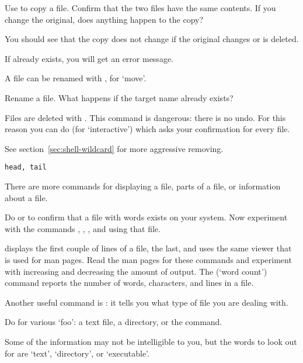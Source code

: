 \begin{exercise}
  Use  to copy a file. Confirm that the two files
  have the same contents. If you change the original, does anything
  happen to the copy?
\end{exercise}
\begin{outcome}
  You should see that the copy does not change if the original changes
  or is deleted.
\end{outcome}
\begin{caution}
  If  already exists, you
  will get an error message.
\end{caution}

A file can be renamed with , for `move'.

\begin{exercise}
  Rename a file. What happens if the target name already exists?
\end{exercise}


Files are deleted with . This command is dangerous: there is no
undo.
For this reason you can do  (for `interactive') which
asks your confirmation for every file.

See section~\ref{sec:shell-wildcard} for more aggressive removing.

 {\texttt{head, tail}}

There are more commands for displaying a file, parts of a file, or
information about a file. 

\begin{exercise}
  Do  or  to
  confirm that a file with words exists on your system. Now experiment
  with the commands , , , and  using
  that file.
\end{exercise}
\begin{outcome}
   displays the first couple of lines of a file,
   the last, and  uses the
  same viewer that is used for man pages. Read the man pages for these
  commands and experiment with increasing and decreasing the amount of
  output.  The  (`word count') command reports the
  number of words, characters, and lines in a file.
\end{outcome}

Another useful command is : it tells you what
type of file you are dealing with.

\begin{exercise}
  Do  for various `foo': a text file, a directory, or the
   command.
\end{exercise}
\begin{outcome}
  Some of the information may not be intelligible to you, but the
  words to look out for are `text', `directory', or `executable'.
\end{outcome}


